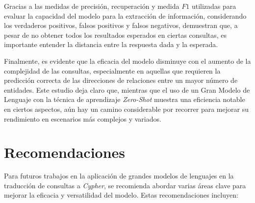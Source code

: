 Gracias a las medidas de precisión, recuperación y medida $F1$ utilizadas para evaluar la capacidad del modelo para la extracción de información, considerando los verdaderos positivos, falsos positivos y falsos negativos, demuestran que, a pesar de no obtener todos los resultados esperados en ciertas consultas, es importante entender la distancia entre la respuesta dada y la esperada.

Finalmente, es evidente que la eficacia del modelo disminuye con el aumento de la complejidad de las consultas, especialmente en aquellas que requieren la predicción correcta de las direcciones de relaciones entre un mayor número de entidades. Este estudio deja claro que, mientras que el uso de un Gran Modelo de Lenguaje con la técnica de aprendizaje \textit{Zero-Shot} muestra una eficiencia notable en ciertos aspectos, aún hay un camino considerable por recorrer para mejorar su rendimiento en escenarios más complejos y variados.

\chapter*{Recomendaciones}\label{chapter:conclusions}
Para futuros trabajos en la aplicación de grandes modelos de lenguajes en la traducción de consultas a \textit{Cypher}, se recomienda abordar varias áreas clave para mejorar la eficacia y versatilidad del modelo. Estas recomendaciones incluyen:

